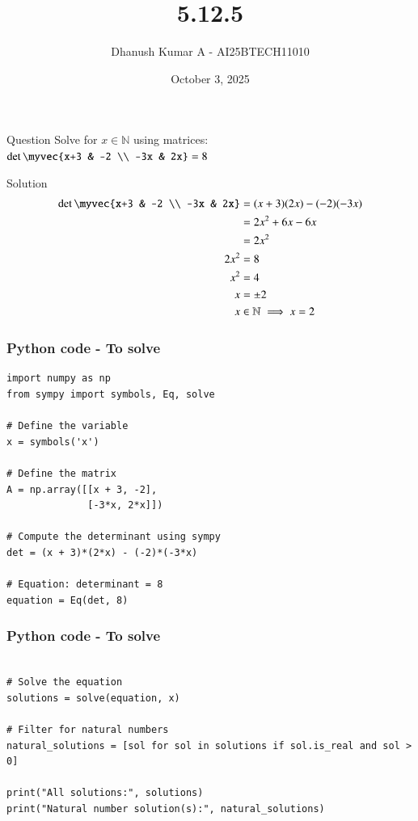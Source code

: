 \documentclass{beamer}
\title 
{5.12.5}
\date{October 3, 2025}
\author 
{Dhanush Kumar A - AI25BTECH11010}
\begin{document}
\frame{\titlepage}
\begin{frame}{Question}
Solve for $x \in \mathbb{N}$ using matrices:
$
\det\myvec{x+3 & -2 \\ -3x & 2x} = 8
$


\end{frame}
\begin{frame}{Solution}
\begin{align}
\det\myvec{x+3 & -2 \\ -3x & 2x} 
&= (x+3)(2x) - (-2)(-3x) \\
&= 2x^2 + 6x - 6x \\
&= 2x^2 \\
2x^2 &= 8 \\
x^2 &= 4 \\
x &= \pm 2 \\
x &\in \mathbb{N} \implies x = 2
\end{align}


\end{frame}



\begin{frame}[fragile]                            
\frametitle{Python code - To solve  }
	\begin{lstlisting}
import numpy as np
from sympy import symbols, Eq, solve

# Define the variable
x = symbols('x')

# Define the matrix
A = np.array([[x + 3, -2],
              [-3*x, 2*x]])

# Compute the determinant using sympy
det = (x + 3)*(2*x) - (-2)*(-3*x)

# Equation: determinant = 8
equation = Eq(det, 8)
\end{lstlisting}
\end{frame}


\begin{frame}[fragile]                            
\frametitle{Python code - To solve  }
	\begin{lstlisting}

# Solve the equation
solutions = solve(equation, x)

# Filter for natural numbers
natural_solutions = [sol for sol in solutions if sol.is_real and sol > 0]

print("All solutions:", solutions)
print("Natural number solution(s):", natural_solutions)


\end{lstlisting}
\end{frame}
\end{document}
